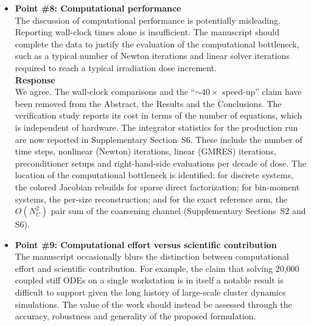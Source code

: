 \documentclass{article}
\newif\ifshowauthornotes
\newcommand{\authornote}[1]{\ifshowauthornotes{\color{red}\ [\textbf{Author action:} #1]}\fi}
\begin{document}
\begin{itemize}
\authornote{The September 17 text still says ``linear dual-basis (Galerkin) reconstruction'' and ``Galerkin formulation'' without defining the inner product. Add the inner-product definition and the Petrov--Galerkin qualification to Section~3.2 or S5.2, or replace ``Galerkin'' by ``moment projection''.}

\item \textbf{Point \#8: Computational performance}\\
The discussion of computational performance is potentially misleading. Reporting wall-clock times alone is insufficient. The manuscript should complete the data to justify the evaluation of the computational bottleneck, such as a typical number of Newton iterations and linear solver iterations required to reach a typical irradiation dose increment.\\

\textbf{Response}\\
We agree. The wall-clock comparisons and the ``$\sim40\times$ speed-up'' claim have been removed from the Abstract, the Results and the Conclusions. The verification study reports its cost in terms of the number of equations, which is independent of hardware. The integrator statistics for the production run are now reported in Supplementary Section~S6. These include the number of time steps, nonlinear (Newton) iterations, linear (GMRES) iterations, preconditioner setups and right-hand-side evaluations per decade of dose. The location of the computational bottleneck is identified: for discrete systems, the colored Jacobian rebuilds for sparse direct factorization; for bin-moment systems, the per-size reconstruction; and for the exact reference arm, the $O(N_C^2)$ pair sum of the coarsening channel (Supplementary Sections~S2 and S6).

\authornote{Extract the CVODE counters (nst, nni, nli, npe, nfe, ncfn/ncfl) from the production-run provenance and add a short table to S6, e.g., per dose decade from $10^{-6}$ to 40 dpa; this table is not yet in the manuscript.}

\item \textbf{Point \#9: Computational effort versus scientific contribution}\\
The manuscript occasionally blurs the distinction between computational effort and scientific contribution. For example, the claim that solving 20,000 coupled stiff ODEs on a single workstation is in itself a notable result is difficult to support given the long history of large-scale cluster dynamics simulations. The value of the work should instead be assessed through the accuracy, robustness and generality of the proposed formulation.\\


\end{itemize}
\end{document}
